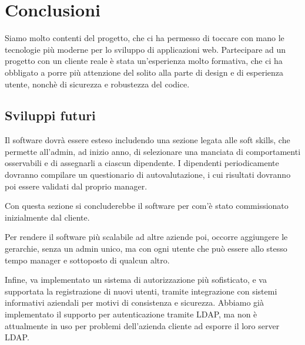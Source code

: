 \section*{Conclusioni}
Siamo molto contenti del progetto, che ci ha permesso di toccare con mano le tecnologie più moderne per lo sviluppo di applicazioni web.
Partecipare ad un progetto con un cliente reale è stata un'esperienza molto formativa, che ci ha obbligato a porre più attenzione del solito alla parte di design e di esperienza utente, nonchè di sicurezza e robustezza del codice.


\subsection*{Sviluppi futuri}

Il software dovrà essere esteso includendo una sezione legata alle soft skills, che permette all'admin, ad inizio anno, di selezionare una manciata di comportamenti osservabili e di assegnarli a ciascun dipendente.
I dipendenti periodicamente dovranno compilare un questionario di autovalutazione, i cui risultati dovranno poi essere validati dal proprio manager.

Con questa sezione si concluderebbe il software per com'è stato commissionato inizialmente dal cliente.

Per rendere il software più scalabile ad altre aziende poi, occorre aggiungere le gerarchie, senza un admin unico, ma con ogni utente che può essere allo stesso tempo manager e sottoposto di qualcun altro.

Infine, va implementato un sistema di autorizzazione più sofisticato, e va supportata la registrazione di nuovi utenti, tramite integrazione con sistemi informativi aziendali per motivi di consistenza e sicurezza.
Abbiamo già implementato il supporto per autenticazione tramite LDAP, ma non è attualmente in uso per problemi dell'azienda cliente ad esporre il loro server LDAP.

